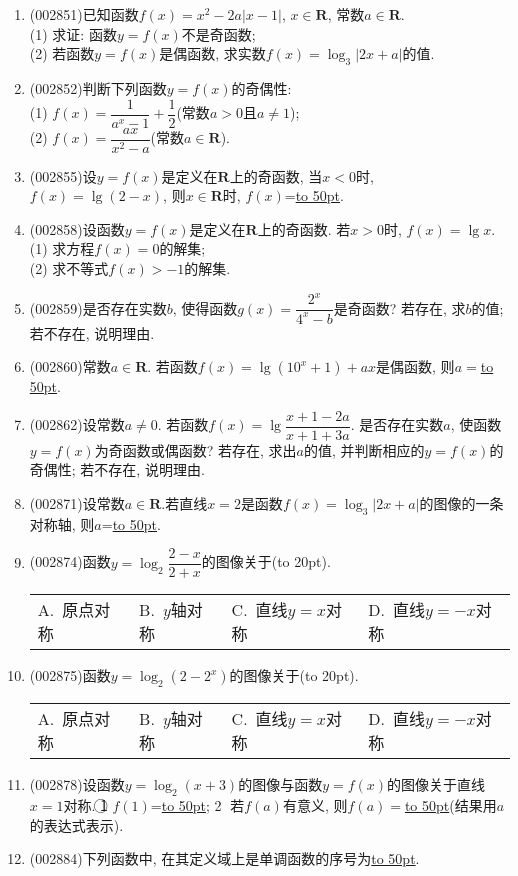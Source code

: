 \documentclass[10pt,a4paper]{article}
\newcommand{\blank}[1]{\underline{\hbox to #1pt{}}}
\newcommand{\bracket}[1]{(\hbox to #1pt{})}
\newcommand{\fourch}[4]{\par\begin{tabular}{p{.23\textwidth}p{.23\textwidth}p{.23\textwidth}p{.23\textwidth}}
A.~#1 &B.~#2& C.~#3& D.~#4
\end{tabular}}
\begin{document}
\begin{enumerate}[1.]
在这六个函数中, 是奇函数但不是偶函数的是\blank{50}, 是偶函数但不是奇函数的是\blank{50}, 既不是奇函数也不是偶函数的是\blank{50}, 既是奇函数又是偶函数的是\blank{50}.
\item {\tiny (002851)}已知函数$f(x)=x^2-2a|x-1|$, $x\in \mathbf{R}$, 常数$a\in \mathbf{R}$.\\
(1) 求证: 函数$y=f(x)$不是奇函数;\\
(2) 若函数$y=f(x)$是偶函数, 求实数$f(x)=\log_3| 2x+a |$的值.
\item {\tiny (002852)}判断下列函数$y=f(x)$的奇偶性:\\
(1) $f(x)=\dfrac 1{a^x-1}+\dfrac 12$(常数$a>0$且$a\ne 1$);\\
(2) $f(x)=\dfrac{ax}{x^2-a}$(常数$a\in \mathbf{R}$).
\item {\tiny (002855)}设$y=f(x)$是定义在$\mathbf{R}$上的奇函数, 当$x<0$时, $f(x)=\lg(2-x)$, 则$x\in \mathbf{R}$时, $f(x)$=\blank{50}.
\item {\tiny (002858)}设函数$y=f(x)$是定义在$\mathbf{R}$上的奇函数. 若$x>0$时, $f(x)=\lg x$.\\
(1) 求方程$f(x)=0$的解集;\\
(2) 求不等式$f(x)>-1$的解集.
\item {\tiny (002859)}是否存在实数$b$, 使得函数$g(x)=\dfrac{2^x}{{4^x}-b}$是奇函数? 若存在, 求$b$的值; 若不存在, 说明理由.
\item {\tiny (002860)}常数$a\in \mathbf{R}$. 若函数$f(x)=\lg(10^x+1)+ax$是偶函数, 则$a=$\blank{50}.
\item {\tiny (002862)}设常数$a\ne 0$. 若函数$f(x)=\lg \dfrac{x+1-2a}{x+1+3a}$. 是否存在实数$a$, 使函数$y=f(x)$为奇函数或偶函数? 若存在, 求出$a$的值, 并判断相应的$y=f(x)$的奇偶性; 若不存在, 说明理由.
\item {\tiny (002871)}设常数$a\in \mathbf{R}$.若直线$x=2$是函数$f(x)=\log_3|2x+a|$的图像的一条对称轴, 则$a$=\blank{50}.
\item {\tiny (002874)}函数$y=\log_2\dfrac{2-x}{2+x}$的图像关于\bracket{20}.
\fourch{原点对称}{$y$轴对称}{直线$y=x$对称}{直线$y=-x$对称}
\item {\tiny (002875)}函数$y=\log_2(2-2^x)$的图像关于\bracket{20}.
\fourch{原点对称}{$y$轴对称}{直线$y=x$对称}{直线$y=-x$对称}
\item {\tiny (002878)}设函数$y=\log_2(x+3)$的图像与函数$y=f(x)$的图像关于直线$x=1$对称. \textcircled{1} $f(1)$=\blank{50}; \textcircled{2} 若$f(a)$有意义, 则$f(a)=$\blank{50}(结果用$a$的表达式表示).
\item {\tiny (002884)}下列函数中, 在其定义域上是单调函数的序号为\blank{50}.\\

\end{enumerate}
\end{document}

